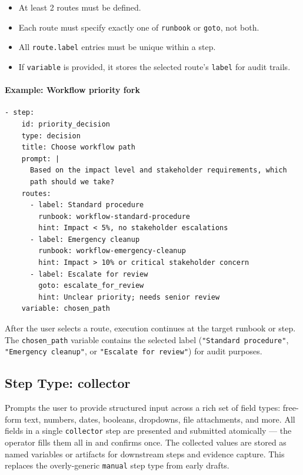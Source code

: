 \begin{itemize}
  \item At least 2 routes must be defined.
  \item Each route must specify exactly one of \texttt{runbook} or \texttt{goto}, not both.
  \item All \texttt{route.label} entries must be unique within a step.
  \item If \texttt{variable} is provided, it stores the selected route's \texttt{label}
        for audit trails.
\end{itemize}

\paragraph{Example: Workflow priority fork}

\begin{verbatim}
- step:
    id: priority_decision
    type: decision
    title: Choose workflow path
    prompt: |
      Based on the impact level and stakeholder requirements, which
      path should we take?
    routes:
      - label: Standard procedure
        runbook: workflow-standard-procedure
        hint: Impact < 5%, no stakeholder escalations
      - label: Emergency cleanup
        runbook: workflow-emergency-cleanup
        hint: Impact > 10% or critical stakeholder concern
      - label: Escalate for review
        goto: escalate_for_review
        hint: Unclear priority; needs senior review
    variable: chosen_path
\end{verbatim}

After the user selects a route, execution continues at the target runbook or
step.  The \texttt{chosen\_path} variable contains the selected label
(\texttt{"Standard procedure"}, \texttt{"Emergency cleanup"}, or
\texttt{"Escalate for review"}) for audit purposes.

\subsection{Step Type: collector}
\label{subsec:step-collector}

Prompts the user to provide structured input across a rich set of field types:
free-form text, numbers, dates, booleans, dropdowns, file attachments, and more.
All fields in a single \texttt{collector} step are presented and submitted
atomically — the operator fills them all in and confirms once.
The collected values are stored as named variables or artifacts for downstream
steps and evidence capture.  This replaces the overly-generic \texttt{manual}
step type from early drafts.

